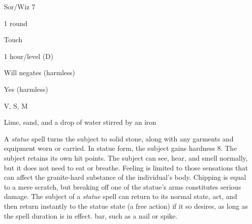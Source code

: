 
\begin{description*}
\item[Level:] Sor/Wiz 7
\item[Casting Time:] 1 round
\item[Range:] Touch
\item[Duration:] 1 hour/level (D)
\item[Saving Throw:] Will negates (harmless)
\item[Spell Resistance:] Yes (harmless)
\item[Components:] V, S, M
\item[Arcane Material Component:] Lime, sand, and a drop of water stirred by an iron
\end{description*}

A \textit{statue} spell turns the subject to solid stone, along with any garments
and equipment worn or carried. In statue form, the subject gains hardness 8. The
subject retains its own hit points.
The subject can see, hear, and smell normally, but it does not need to eat or breathe.
Feeling is limited to those sensations that can affect the granite-hard substance
of the individual's body. Chipping is equal to a mere scratch, but breaking off
one of the statue's arms constitutes serious damage.
The subject of a \textit{statue} spell can return to its normal state, act, and
then return instantly to the statue state (a free action) if it so desires, as
long as the spell duration is in effect.
bar, such as a nail or spike.
